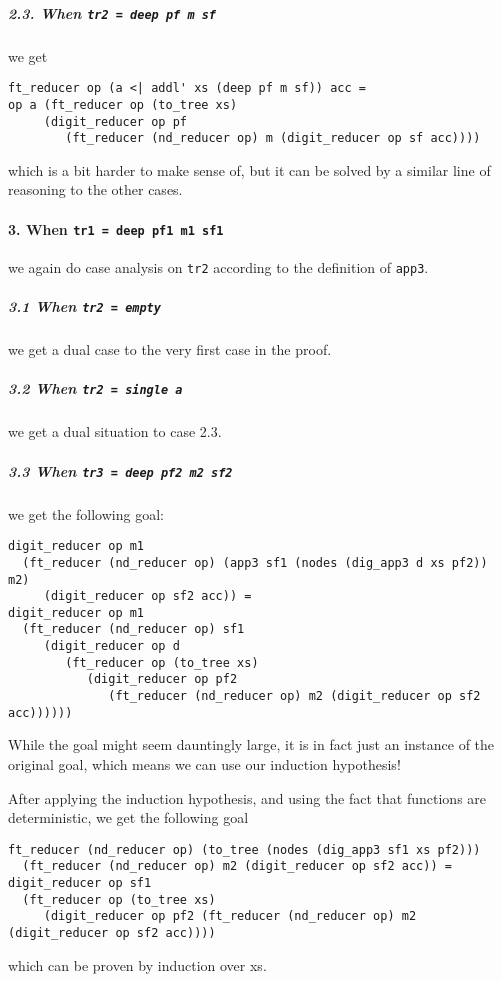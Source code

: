 \documentclass{article}
\newcommand{\code}[1]{\texttt{#1}}
\begin{document}
\subparagraph{2.3. When \code{tr2 = deep pf m sf}} we get

\begin{verbatim}
ft_reducer op (a <| addl' xs (deep pf m sf)) acc =
op a (ft_reducer op (to_tree xs)
     (digit_reducer op pf
        (ft_reducer (nd_reducer op) m (digit_reducer op sf acc))))
\end{verbatim}
which is a bit harder to make sense of, but it can be solved by a similar line
of reasoning to the other cases.

\paragraph*{3. When \code{tr1 = deep pf1 m1 sf1}} we again do case analysis
on \code{tr2} according to the definition of \code{app3}.

\subparagraph{3.1 When \code{tr2 = empty}} we get a dual case to the very
first case in the proof.

\subparagraph{3.2 When \code{tr2 = single a}} we get a dual situation to
case 2.3.

\subparagraph{3.3 When \code{tr3 = deep pf2 m2 sf2}} we get the following
goal:

\begin{verbatim}
digit_reducer op m1
  (ft_reducer (nd_reducer op) (app3 sf1 (nodes (dig_app3 d xs pf2)) m2)
     (digit_reducer op sf2 acc)) =
digit_reducer op m1
  (ft_reducer (nd_reducer op) sf1
     (digit_reducer op d
        (ft_reducer op (to_tree xs)
           (digit_reducer op pf2
              (ft_reducer (nd_reducer op) m2 (digit_reducer op sf2 acc))))))
\end{verbatim}

While the goal might seem dauntingly large, it is in fact just an instance
of the original goal, which means we can use our induction hypothesis!

After applying the induction hypothesis, and using the fact that functions
are deterministic, we get the following goal

\begin{verbatim}
ft_reducer (nd_reducer op) (to_tree (nodes (dig_app3 sf1 xs pf2)))
  (ft_reducer (nd_reducer op) m2 (digit_reducer op sf2 acc)) =
digit_reducer op sf1
  (ft_reducer op (to_tree xs)
     (digit_reducer op pf2 (ft_reducer (nd_reducer op) m2 (digit_reducer op sf2 acc))))
\end{verbatim}

which can be proven by induction over xs.
\end{document}
